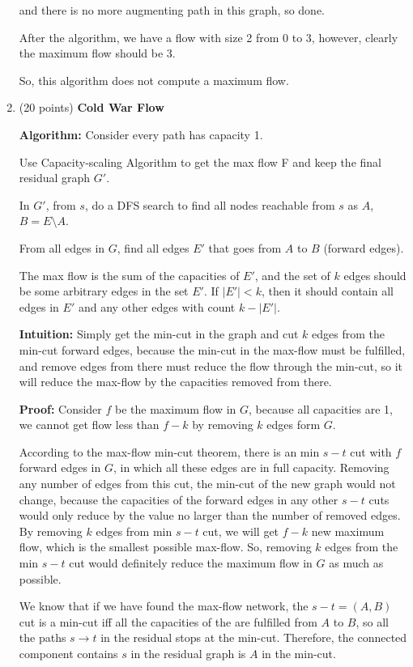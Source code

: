 \documentclass{article}
\newcommand{\algorithm}{\textbf{Algorithm:} }
\newcommand{\proof}{\textbf{Proof:} }
\newcommand{\intuition}{\textbf{Intuition:} }
\begin{document}
\begin{enumerate}[topsep=0pt]
and there is no more augmenting path in this graph, so done.

After the algorithm, we have a flow with size 2 from $0$ to $3$, 
however, clearly the maximum flow should be 3.

So, this algorithm does not compute a maximum flow.

\item (20 points) \textbf{Cold War Flow}

\algorithm
Consider every path has capacity 1.

Use Capacity-scaling Algorithm to get the max flow F and keep the final residual graph $G'$.

In $G'$, from $s$, do a DFS search to find all nodes reachable from $s$ as $A$, $B=E\setminus A$.

From all edges in $G$, find all edges $E'$ that goes from $A$ to $B$ (forward edges).

The max flow is the sum of the capacities of $E'$, and the set of $k$ edges should be
some arbitrary edges in the set $E'$. If $|E'|<k$, then it should contain all edges in $E'$
and any other edges with count $k-|E'|$.

\intuition
Simply get the min-cut in the graph and cut $k$ edges from the min-cut forward edges,
because the min-cut in the max-flow must be fulfilled, and remove edges from there must reduce the flow through the min-cut,
so it will reduce the max-flow by the capacities removed from there.

\proof
Consider $f$ be the maximum flow in $G$, because all capacities are 1, 
we cannot get flow less than $f-k$ by removing $k$ edges form $G$.

According to the max-flow min-cut theorem, there is an min $s-t$ cut with $f$ forward edges in $G$,
in which all these edges are in full capacity. 
Removing any number of edges from this cut, the min-cut of the new graph would not change,
because the capacities of the forward edges in any other $s-t$ cuts would only reduce by the value no larger than the number of removed edges.
By removing $k$ edges from min $s-t$ cut, we will get $f-k$ new maximum flow, which is the smallest possible max-flow.
So, removing $k$ edges from the min $s-t$ cut would definitely reduce the maximum flow in $G$ as much as possible.

We know that if we have found the max-flow network,
the $s-t=(A,B)$ cut is a min-cut iff all the capacities of the are fulfilled from $A$ to $B$,
so all the paths $s\rightarrow t$ in the residual stops at the min-cut.
Therefore, the connected component contains $s$ in the residual graph is $A$ in the min-cut.


\end{enumerate}
\end{document}
